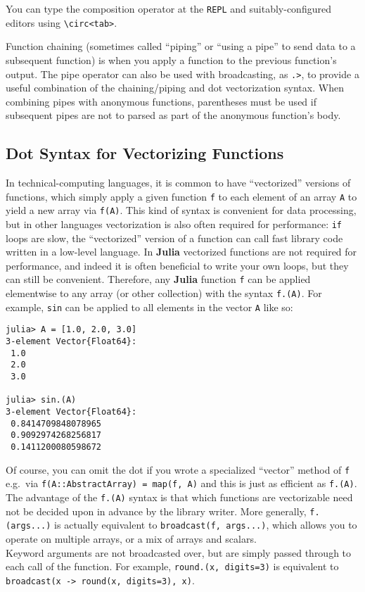\documentclass[
]{article}
\begin{document}
You can type the composition operator at the \texttt{REPL} and
suitably-configured editors using
\texttt{\textbackslash{}circ\textless{}tab\textgreater{}}.

Function chaining (sometimes called ``piping'' or ``using a pipe'' to
send data to a subsequent function) is when you apply a function to the
previous function's output. The pipe operator can also be used with
broadcasting, as \texttt{.\textbar{}\textgreater{}}, to provide a useful
combination of the chaining/piping and dot vectorization syntax. When
combining pipes with anonymous functions, parentheses must be used if
subsequent pipes are not to parsed as part of the anonymous function's
body.

\hypertarget{dot-syntax-for-vectorizing-functions}{%
\subsection{Dot Syntax for Vectorizing
Functions}\label{dot-syntax-for-vectorizing-functions}}

In technical-computing languages, it is common to have ``vectorized''
versions of functions, which simply apply a given function \texttt{f} to
each element of an array \texttt{A} to yield a new array via
\texttt{f(A)}. This kind of syntax is convenient for data processing,
but in other languages vectorization is also often required for
performance: \texttt{if} loops are slow, the ``vectorized'' version of a
function can call fast library code written in a low-level language. In
\textbf{Julia} vectorized functions are not required for performance,
and indeed it is often beneficial to write your own loops, but they can
still be convenient. Therefore, any \textbf{Julia} function \texttt{f}
can be applied elementwise to any array (or other collection) with the
syntax \texttt{f.(A)}. For example, \texttt{sin} can be applied to all
elements in the vector \texttt{A} like so:

\begin{verbatim}
julia> A = [1.0, 2.0, 3.0]
3-element Vector{Float64}:
 1.0
 2.0
 3.0

julia> sin.(A)
3-element Vector{Float64}:
 0.8414709848078965
 0.9092974268256817
 0.1411200080598672
\end{verbatim}

Of course, you can omit the dot if you wrote a specialized ``vector''
method of \texttt{f} e.g.~via
\texttt{f(A::AbstractArray)\ =\ map(f,\ A)} and this is just as
efficient as \texttt{f.(A)}. The advantage of the \texttt{f.(A)} syntax
is that which functions are vectorizable need not be decided upon in
advance by the library writer. More generally, \texttt{f.(args...)} is
actually equivalent to \texttt{broadcast(f,\ args...)}, which allows you
to operate on multiple arrays, or a mix of arrays and scalars.\\
Keyword arguments are not broadcasted over, but are simply passed
through to each call of the function. For example,
\texttt{round.(x,\ digits=3)} is equivalent to
\texttt{broadcast(x\ -\textgreater{}\ round(x,\ digits=3),\ x)}.
\end{document}
